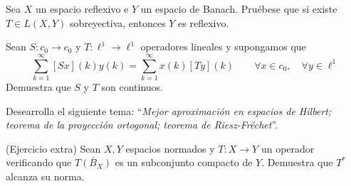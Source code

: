 \documentclass[12pt]{article}
\begin{document}
    \begin{ejercicio}[2 puntos]
        Sea $X$ un espacio reflexivo e $Y$ un espacio de Banach. Pruébese que si existe $T\in L(X,Y)$ sobreyectiva, entonces $Y$ es reflexivo.
    \end{ejercicio}

    \begin{ejercicio}[2 puntos]
        Sean $S:c_0\to c_0$ y $T:\ell^1\to \ell^1$ operadores lineales y supongamos que
        \begin{equation*}
            \sum_{k=1}^{\infty}[Sx](k)y(k) = \sum_{k=1}^{\infty}x(k)[Ty](k) \qquad \forall x\in c_0, \quad \forall y\in \ell^1
        \end{equation*}
        Demuestra que $S$ y $T$ son continuos.
    \end{ejercicio}

    \begin{ejercicio}[4 puntos]
        Desearrolla el siguiente tema: ``\textit{Mejor aproximación en espacios de Hilbert; teorema de la proyección ortogonal; teorema de Riesz-Fréchet}''.
    \end{ejercicio}

    \begin{ejercicio}
        (Ejercicio extra)\newline
        Sean $X,Y$ espacios normados y $T:X\to Y$ un operador verificando que $\overline{T(B_X)}$ es un subconjunto compacto de $Y$. Demuestra que $T^\ast$ alcanza su norma.
    \end{ejercicio}

    \newpage
    \setcounter{ejercicio}{0} %
\end{document}
